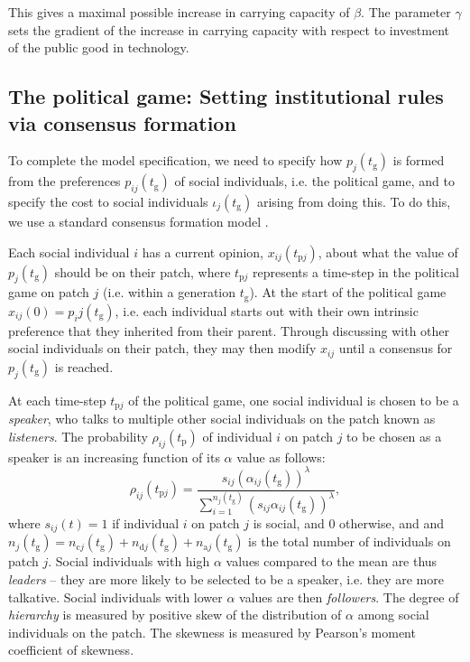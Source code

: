 \documentclass{rstb}
\begin{document}
\begin{linenumbers}
 This gives a maximal possible increase in carrying capacity of $\beta$. The parameter $\gamma$ sets the gradient of the increase in carrying capacity with respect to investment of the public good in technology.

\subsection*{The political game: Setting institutional rules via consensus formation} 
To complete the model specification, we need to specify how $p_j(t_\mathrm{g})$ is formed from the preferences $p_{ij}(t_\mathrm{g})$ of social individuals, i.e. the political game, and to specify the cost to social individuals $\iota_j(t_\mathrm{g})$ arising from doing this. To do this, we use a standard consensus formation model \cite{Gavrilets:2016:a,Perret:2020:a,Perret:2022:a}.

Each social individual $i$ has a current opinion, $x_{ij}(t_{\mathrm{p}j})$, about what the value of $p_j(t_\mathrm{g})$ should be on their patch, where $t_{\mathrm{p}j}$ represents a time-step in the political game on patch $j$ (i.e. within a generation $t_\mathrm{g}$). At the start of the political game $x_{ij}(0)=p_ij(t_\mathrm{g})$, i.e. each individual starts out with their own intrinsic preference that they inherited from their parent. Through discussing with other social individuals on their patch, they may then modify $x_{ij}$ until a consensus for $p_j(t_\mathrm{g})$ is reached.

At each time-step $t_{\mathrm{p}j}$ of the political game, one social individual is chosen to be a \emph{speaker}, who talks to multiple other social individuals on the patch known as \emph{listeners}. The probability $\rho_{ij}(t_\mathrm{p})$ of individual $i$ on patch $j$ to be chosen as a speaker is an increasing function of its $\alpha$ value as follows:
\begin{equation}
\rho_{ij}(t_{\mathrm{p}j})=\frac{s_{ij}(\alpha_{ij}(t_\mathrm{g}))^\lambda}{{\sum_{i=1}^{n_j(t_\mathrm{g})}}\left(s_{ij}\alpha_{ij}\left(t_\mathrm{g}\right)\right)^\lambda},
\label{eqnProbSpeaker}
\end{equation}
where $s_{ij}(t)=1$ if individual $i$ on patch $j$ is social, and 0 otherwise, and and $n_{j}(t_\mathrm{g})=n_{\mathrm{c}j}(t_\mathrm{g})+n_{\mathrm{d}j}(t_\mathrm{g})+n_{\mathrm{a}j}(t_\mathrm{g})$ is the total number of individuals on patch $j$. Social individuals with high $\alpha$ values compared to the mean are thus \emph{leaders} -- they are more likely to be selected to be a speaker, i.e. they are more talkative. Social individuals with lower $\alpha$ values are then \emph{followers}. The degree of \emph{hierarchy} is measured by positive skew of the distribution of $\alpha$ among social individuals on the patch. The skewness is measured by Pearson's moment coefficient of skewness.


\end{linenumbers}
\end{document}
